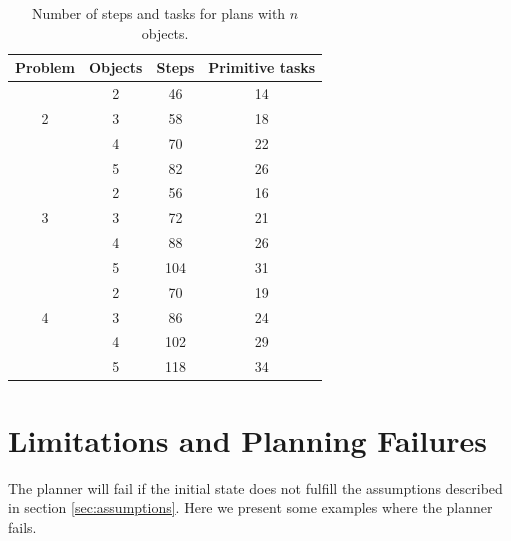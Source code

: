\documentclass[paper=a4, fontsize=11pt]{scrartcl}
\begin{document}
	
	\begin{table}[h!]
	
	\centering
	
	\begin{tabular}{cccc}
		\toprule   
		
		Problem & Objects & Steps  & Primitive tasks\\
		\midrule
		
		 \multirow{3}{*}[-3pt]{2} & {2} & {46} & {14} \\
		 
		 {} & {3} & {58} & {18} \\
		 
		 {} & {4} & {70} & {22} \\
		 
		 {} & {5} & {82} & {26} \\
		 
		 \midrule
		 
		 \multirow{3}{*}[-3pt]{3} & {2} & {56} & {16} \\
		 
		 {} & {3} & {72} & {21} \\
		 
		 {} & {4} & {88} & {26} \\
		 
		 {} & {5} & {104} & {31} \\
		 
		 \midrule
		 
		 \multirow{3}{*}[-3pt]{4} & {2} & {70} & {19} \\
		 
		 {} & {3} & {86} & {24} \\
		 
		 {} & {4} & {102} & {29} \\
		 
		 {} & {5} & {118} & {34} \\
	
		\bottomrule
	\end{tabular}
	\caption{Number of steps and tasks for plans with $n$ objects.} 
	\label{table:n-objects}
	\end{table}
	

	\section{Limitations and Planning Failures} \label{sec:limitations}
	
	The planner will fail if the initial state does not fulfill the assumptions described in section \ref{sec:assumptions}. Here we present some examples where the planner fails.
	
\end{document}
